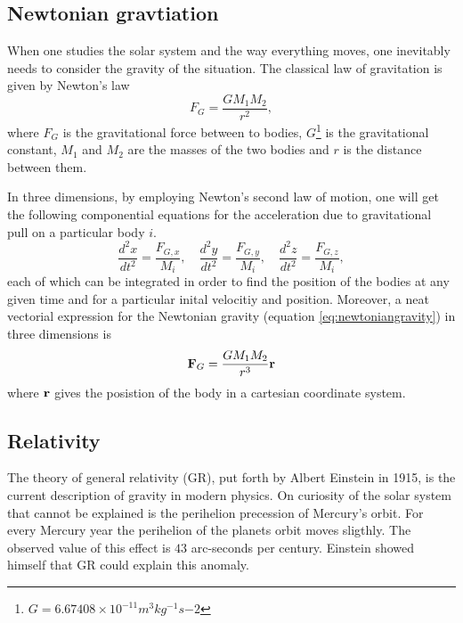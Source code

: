 \documentclass[10pt,a4paper]{amsart}
\begin{document}
\subsection{Newtonian gravtiation}
When one studies the solar system and the way everything moves, one inevitably needs to consider the gravity of the situation. The classical law of gravitation is given by Newton's law
\begin{equation}
\label{eq:newtoniangravity}
F_G = \frac{GM_1M_2}{r^2},
\end{equation} 
where $F_G$ is the gravitational force between to bodies, $G$\footnote{$G=6.67408 \times 10^{-11} m^3 kg^{-1} s{-2}$} is the gravitational constant, $M_1$ and $M_2$ are the masses of the two bodies and $r$ is the distance between them.

In three dimensions, by employing Newton's second law of motion, one will get the following componential equations for the acceleration due to gravitational pull on a particular body $i$.
\begin{equation}
\label{eq:componentalnewton}
\frac{d^2x}{dt^2} = \frac{F_{G,x}}{M_i}, \quad
\frac{d^2y}{dt^2} = \frac{F_{G,y}}{M_i}, \quad
\frac{d^2z}{dt^2} = \frac{F_{G,z}}{M_i},
\end{equation}
each of which can be integrated in order to find the position of the bodies at any given time and for a particular inital velocitiy and position. Moreover, a neat vectorial expression for the Newtonian gravity (equation \ref{eq:newtoniangravity}) in three dimensions is
\begin{equation}
\vb{F}_G = \frac{GM_1M_2}{r^3}\vb{r}
\end{equation}
where $\vb{r}$ gives the posistion of the body in a cartesian coordinate system.

\subsection{Relativity}

The theory of general relativity (GR), put forth by Albert Einstein in 1915, is the current description of gravity in modern physics. On curiosity of the solar system that cannot be explained is the perihelion precession of Mercury's orbit. For every Mercury year the perihelion of the planets orbit moves sligthly. The observed value of this effect is $43$ arc-seconds per century. Einstein showed himself that GR could explain this anomaly.
\end{document}
